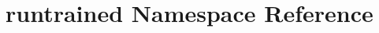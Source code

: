 \hypertarget{namespaceruntrained}{\section{runtrained Namespace Reference}
\label{namespaceruntrained}
}

